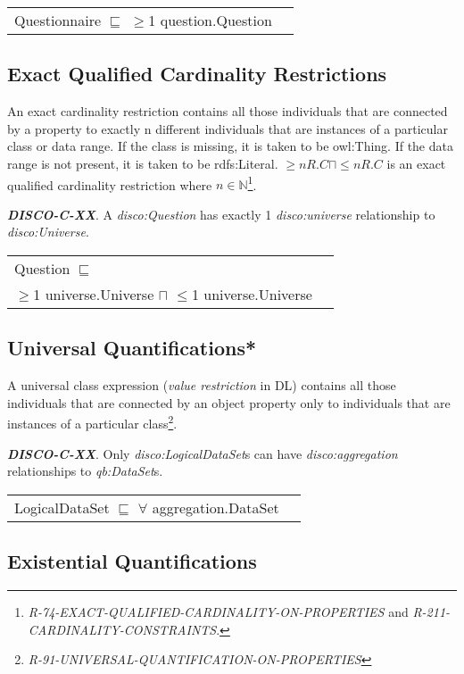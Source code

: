 \documentclass{elsart3p}    %
\newenvironment{DL}{
  \vspace{0cm}
  \begin{tabular}{l l}

}{
  \end{tabular}
}
\begin{document}
\begin{DL}
Questionnaire $\sqsubseteq$ $\geq$1 question.Question
\end{DL}

\subsection{Exact Qualified Cardinality Restrictions}

An exact cardinality restriction contains all those individuals that are connected by a property to exactly n different individuals that are instances of a particular class or data range. 
If the class is missing, it is taken to be owl:Thing. 
If the data range is not present, it is taken to be rdfs:Literal.
$\geq n R. C \sqcap \leq n R. C $ is an exact qualified cardinality restriction where $n \in \mathbb{N}$\footnote{{\em R-74-EXACT-QUALIFIED-CARDINALITY-ON-PROPERTIES} and {\em R-211-CARDINALITY-CONSTRAINTS}.}.

\textbf{{\em DISCO-C-XX}}. 
A {\em disco:Question} has exactly 1 {\em disco:universe} relationship to {\em disco:Universe}.

\begin{DL}
Question $\sqsubseteq$ \\
$\geq$1 universe.Universe $\sqcap$ $\leq$1 universe.Universe \\
\end{DL}

\subsection{Universal Quantifications*}

A universal class expression ({\em value restriction} in DL) contains all those individuals that are connected by an object property only to individuals that are instances of a particular class\footnote{{\em R-91-UNIVERSAL-QUANTIFICATION-ON-PROPERTIES}}.

\textbf{{\em DISCO-C-XX}}.
Only {\em disco:LogicalDataSet}s can have {\em disco:aggregation} relationships to {\em qb:DataSet}s.

\begin{DL}
LogicalDataSet $\sqsubseteq$ $\forall$ aggregation.DataSet \\
\end{DL}

\subsection{Existential Quantifications}
\end{document}
